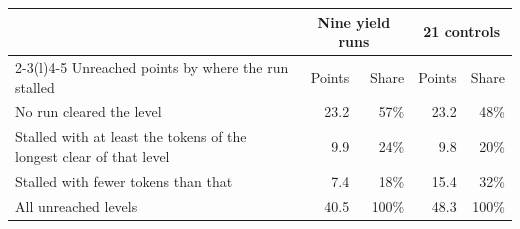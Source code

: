 \begin{table}[!htb]
\medskip
\begin{tabular}{@{}p{5.2cm}rrrr@{}}
\toprule
 & \multicolumn{2}{c}{Nine yield runs} & \multicolumn{2}{c}{21 controls} \\
\cmidrule(lr){2-3}\cmidrule(l){4-5}
Unreached points by where the run stalled & Points & Share & Points & Share \\
\midrule
No run cleared the level & 23.2 & 57\% & 23.2 & 48\% \\ %
Stalled with at least the tokens of the longest clear of that level & 9.9 & 24\% & 9.8 & 20\% \\ %
Stalled with fewer tokens than that & 7.4 & 18\% & 15.4 & 32\% \\ %
All unreached levels & 40.5 & 100\% & 48.3 & 100\% \\ %
\bottomrule
\end{tabular}
\end{table}
